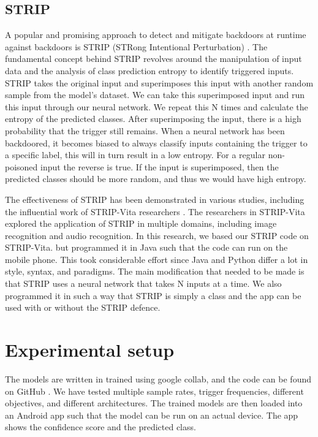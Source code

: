 \documentclass{report}
\theoremstyle{definition}
\theoremstyle{remark}
\begin{document}
\section{STRIP}
A popular and promising approach to detect and mitigate backdoors at runtime against backdoors is STRIP (STRong Intentional Perturbation) \cite{Strip}. The fundamental concept behind STRIP revolves around the manipulation of input data and the analysis of class prediction entropy to identify triggered inputs. STRIP takes the original input and superimposes this input with another random sample from the model's dataset. We can take this superimposed input and run this input through our neural network. We repeat this N times and calculate the entropy of the predicted classes. After superimposing the input, there is a high probability that the trigger still remains. When a neural network has been backdoored, it becomes biased to always classify inputs containing the trigger to a specific label, this will in turn result in a low entropy. For a regular non-poisoned input the reverse is true. If the input is superimposed, then the predicted classes should be more random, and thus we would have high entropy. 

The effectiveness of STRIP has been demonstrated in various studies, including the influential work of STRIP-Vita researchers \cite{StripVita}. The researchers in STRIP-Vita explored the application of STRIP in multiple domains, including image recognition and audio recognition. In this research, we based our STRIP code on STRIP-Vita. \cite{StripVita} but programmed it in Java such that the code can run on the mobile phone. This took considerable effort since Java and Python differ a lot in style, syntax, and paradigms. The main modification that needed to be made is that STRIP uses a neural network that takes N inputs at a time. We also programmed it in such a way that STRIP is simply a class and the app can be used with or without the STRIP defence.


\chapter{Experimental setup}
The models are written in trained using google collab, and the code can be found on GitHub \cite{GH}. We have tested multiple sample rates, trigger frequencies, different objectives, and different architectures. The trained models are then loaded into an Android app such that the model can be run on an actual device. The app shows the confidence score and the predicted class.
\end{document}
